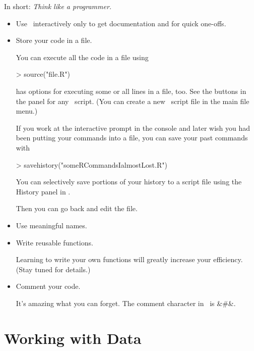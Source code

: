 In short: \emph{Think like a programmer.}  
\begin{itemize}
  \item Use \R\ interactively only to get documentation and for quick one-offs.
  \item Store your code in a file.  %

\smallskip
  You can execute all the code in a file using 

\begin{Schunk}
\begin{Sinput}
> source("file.R") 
\end{Sinput}
\end{Schunk}
\Rstudio has options for executing some or all lines in a file, too. 
See the buttons in the panel for any \R\ script.  (You can create a new \R\ script
file in the main file menu.)

\smallskip\noindent
If you work at the interactive prompt in the console and later wish you had 
been putting your commands into a file, you can save your past commands with

\begin{Schunk}
\begin{Sinput}
> savehistory("someRCommandsIalmostLost.R")
\end{Sinput}
\end{Schunk}

You can selectively save portions of your history to a script file
using the History panel in \Rstudio.

\noindent
Then you can go back and edit the file.

  \item Use meaningful names.
  \item Write reusable functions.

  Learning to write your own functions will greatly increase your efficiency.
  (Stay tuned for details.)

  \item Comment your code.

  It's amazing what you can forget.  The comment character in \R\ is &#&.
  \Rindex{\#}%
\end{itemize}

\section{Working with Data}
\label{sec:MoreR-Data}%

